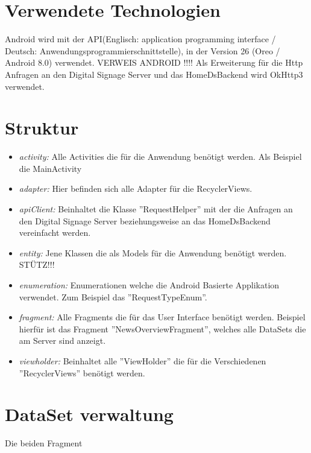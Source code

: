\section{Verwendete Technologien}
Android wird mit der API(Englisch: application programming interface / Deutsch: Anwendungsprogrammierschnittstelle), in der Version 26 (Oreo / Android 8.0) verwendet. 
VERWEIS ANDROID !!!!
Als Erweiterung für die Http Anfragen an den Digital Signage Server und das HomeDsBackend wird OkHttp3 verwendet.

\section{Struktur}
\begin{itemize}
	\item {\em activity:} Alle Activities die für die Anwendung benötigt werden. Als Beispiel die MainActivity
	
	\item {\em adapter:} Hier befinden sich alle Adapter für die RecyclerViews.
	
	\item {\em apiClient:} Beinhaltet die Klasse ''RequestHelper'' mit der die Anfragen an den Digital Signage Server beziehungsweise an das HomeDsBackend vereinfacht werden.
	
	\item {\em entity:} Jene Klassen die als Models für die Anwendung benötigt werden. 
	STÜTZ!!!
	
	\item {\em enumeration:} Enumerationen welche die Android Basierte Applikation verwendet. Zum Beispiel das ''RequestTypeEnum''.
	
	\item {\em fragment:} Alle Fragments die für das User Interface benötigt werden. Beispiel hierfür ist das Fragment ''NewsOverviewFragment'', welches alle DataSets die am Server sind anzeigt.
	
	\item {\em viewholder:} Beinhaltet alle ''ViewHolder'' die für die Verschiedenen ''RecyclerViews'' benötigt werden. 
	  
		
\end{itemize}

\section{DataSet verwaltung}
Die beiden Fragment
